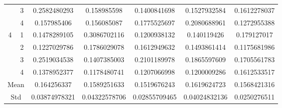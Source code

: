 \documentclass[draft,dvipsnames]{drexel-thesis}
\begin{document}
\begin{thesis}
\begin{table}[!t]
\begin{tabular}{|c|c|c|c|c|c|c|}
                      & 3                   & 0.2582480293  & 0.158985598   & 0.1400841698  & 0.1527932584  & 0.1612278037 \\ \cline{2-7} 
                      & 4                   & 0.157985406   & 0.156085087   & 0.1775525697  & 0.2080688961  & 0.1272955388 \\ \hline
\multirow{4}{*}{4}    & 1                   & 0.1478289105  & 0.3086702116  & 0.1200938132  & 0.140119426   & 0.179127017  \\ \cline{2-7} 
                      & 2                   & 0.1227029786  & 0.1786029078  & 0.1612949632  & 0.1493861414  & 0.1175681986 \\ \cline{2-7} 
                      & 3                   & 0.2519034538  & 0.1407385003  & 0.2101189978  & 0.1865597609  & 0.1705561783 \\ \cline{2-7} 
                      & 4                   & 0.1378952377  & 0.1178480741  & 0.1207066998  & 0.1200009286  & 0.1612533517 \\ \hline
\multicolumn{2}{|c|}{Mean}                  & 0.164256337   & 0.1589251633  & 0.1519676243  & 0.1619624723  & 0.1568421316 \\ \hline
\multicolumn{2}{|c|}{Std}                   & 0.03874978321 & 0.04322578706 & 0.02855709465 & 0.04024832136 & 0.0250276511 \\ \hline
\end{tabular}
\end{table}


\end{thesis}
\end{document}
